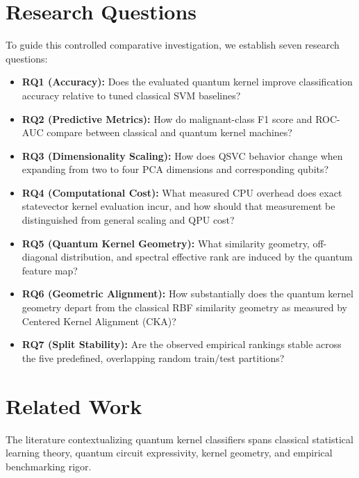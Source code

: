 \documentclass[12pt,a4paper]{article}
\begin{document}
\section{Research Questions}
To guide this controlled comparative investigation, we establish seven research questions:
\begin{itemize}
    \item \textbf{RQ1 (Accuracy):} Does the evaluated quantum kernel improve classification accuracy relative to tuned classical SVM baselines?
    \item \textbf{RQ2 (Predictive Metrics):} How do malignant-class F1 score and ROC-AUC compare between classical and quantum kernel machines?
    \item \textbf{RQ3 (Dimensionality Scaling):} How does QSVC behavior change when expanding from two to four PCA dimensions and corresponding qubits?
    \item \textbf{RQ4 (Computational Cost):} What measured CPU overhead does exact statevector kernel evaluation incur, and how should that measurement be distinguished from general scaling and QPU cost?
    \item \textbf{RQ5 (Quantum Kernel Geometry):} What similarity geometry, off-diagonal distribution, and spectral effective rank are induced by the quantum feature map?
    \item \textbf{RQ6 (Geometric Alignment):} How substantially does the quantum kernel geometry depart from the classical RBF similarity geometry as measured by Centered Kernel Alignment (CKA)?
    \item \textbf{RQ7 (Split Stability):} Are the observed empirical rankings stable across the five predefined, overlapping random train/test partitions?
\end{itemize}

\section{Related Work}
The literature contextualizing quantum kernel classifiers spans classical statistical learning theory, quantum circuit expressivity, kernel geometry, and empirical benchmarking rigor.
\end{document}
